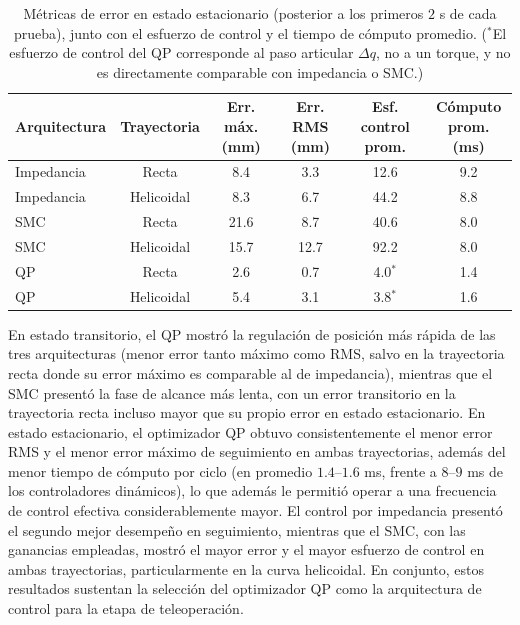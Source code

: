 \begin{table}[H]
	\centering
	\begin{tabular}{l|c|c|c|c|c}
        \textbf{Arquitectura} & \textbf{Trayectoria} & \shortstack{\textbf{Err. máx.}                          \\\textbf{(mm)}} & \shortstack{\textbf{Err. RMS}\\\textbf{(mm)}} & \shortstack{\textbf{Esf. control}\\\textbf{prom.}} & \shortstack{\textbf{Cómputo}\\\textbf{prom. (ms)}} \\
        \hline
        Impedancia            & Recta                & 8.4                            & 3.3  & 12.6      & 9.2 \\
        Impedancia            & Helicoidal           & 8.3                            & 6.7  & 44.2      & 8.8 \\
        SMC                   & Recta                & 21.6                           & 8.7  & 40.6      & 8.0 \\
        SMC                   & Helicoidal           & 15.7                           & 12.7 & 92.2      & 8.0 \\
        QP                    & Recta                & 2.6                            & 0.7  & 4.0\(^{*}\) & 1.4 \\
        QP                    & Helicoidal           & 5.4                            & 3.1  & 3.8\(^{*}\) & 1.6 \\
    \end{tabular}
	\caption{Métricas de error en estado estacionario (posterior a los
		primeros \(2\) s de cada prueba), junto con el esfuerzo de control y el
		tiempo de cómputo promedio. (\(^{*}\)El esfuerzo de control del QP
		corresponde al paso articular \(\Delta q\), no a un torque, y no es
		directamente comparable con impedancia o SMC.)}
	\label{tab:comparacion_arquitecturas}
\end{table}

En estado transitorio, el QP mostró la regulación de posición más rápida de
las tres arquitecturas (menor error tanto máximo como RMS, salvo en la
trayectoria recta donde su error máximo es comparable al de impedancia),
mientras que el SMC presentó la fase de alcance más lenta, con un error
transitorio en la trayectoria recta incluso mayor que su propio error en
estado estacionario. En estado estacionario, el optimizador QP obtuvo
consistentemente el menor error RMS y el menor error máximo de seguimiento
en ambas trayectorias, además del menor tiempo de cómputo por ciclo (en
promedio \(1.4\)--\(1.6\) ms, frente a \(8\)--\(9\) ms de los controladores
dinámicos), lo que además le permitió operar a una frecuencia de control
efectiva considerablemente mayor. El control por impedancia presentó el
segundo mejor desempeño en seguimiento, mientras que el SMC, con las
ganancias empleadas, mostró el mayor error y el mayor esfuerzo de control en
ambas trayectorias, particularmente en la curva helicoidal. En conjunto,
estos resultados sustentan la selección del optimizador QP como la
arquitectura de control para la etapa de teleoperación.

